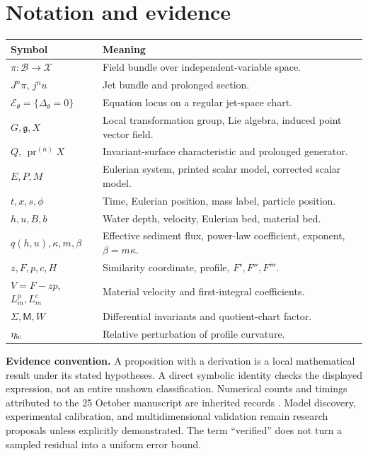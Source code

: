 \documentclass[11pt,a4paper,oneside]{report}
\numberwithin{equation}{chapter}
\newcommand{\E}{\mathcal E}
\newcommand{\pr}{\operatorname{pr}}
\begin{document}
\chapter*{Notation and evidence}
\begin{longtable}{@{}p{}p{}@{}}
\toprule Symbol & Meaning\\\midrule
$\pi:\mathcal B\to\mathcal X$ & Field bundle over independent-variable space.\\
$J^n\pi$, $j^nu$ & Jet bundle and prolonged section.\\
$\E_\theta=\{\Delta_\theta=0\}$ & Equation locus on a regular jet-space chart.\\
$G,\mathfrak g,X$ & Local transformation group, Lie algebra, induced point vector field.\\
$Q$, $\pr^{(n)}X$ & Invariant-surface characteristic and prolonged generator.\\
$E,P,M$ & Eulerian system, printed scalar model, corrected scalar model.\\
$t,x,s,\phi$ & Time, Eulerian position, mass label, particle position.\\
$h,u,B,b$ & Water depth, velocity, Eulerian bed, material bed.\\
$q(h,u),\kappa,m,\beta$ & Effective sediment flux, power-law coefficient, exponent, $\beta=m\kappa$.\\
$z,F,p,c,H$ & Similarity coordinate, profile, $F',F'',F'''$.\\
$V=F-zp$, $L_m^{\mathrm p},L_m^{\mathrm c}$ & Material velocity and first-integral coefficients.\\
$\Sigma,\mathsf M,W$ & Differential invariants and quotient-chart factor.\\
$\eta_{\rm ic}$ & Relative perturbation of profile curvature.\\\bottomrule
\end{longtable}
\textbf{Evidence convention.} A proposition with a derivation is a local mathematical result under its stated hypotheses. A direct symbolic identity checks the displayed expression, not an entire unshown classification. Numerical counts and timings attributed to the 25 October manuscript are inherited records \cite{projectdraft}. Model discovery, experimental calibration, and multidimensional validation remain research proposals unless explicitly demonstrated. The term ``verified'' does not turn a sampled residual into a uniform error bound.
\tableofcontents\listoffigures\listoftables
\clearpage{}
\end{document}
